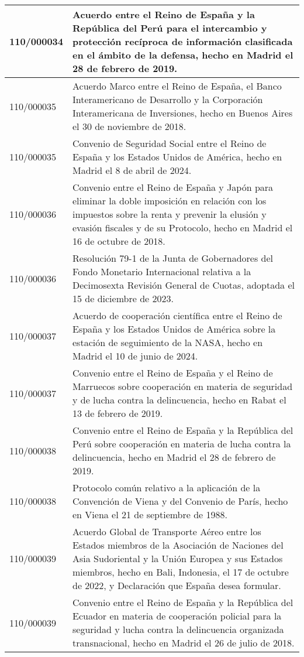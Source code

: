 {\begin{table}[H]
\begin{center}
\begin{tabularx}{\linewidth}{| l | X |}
\hline
110/000034 & Acuerdo entre el Reino de España y la República del Perú para el intercambio y protección recíproca de información clasificada en el ámbito de la defensa, hecho en Madrid el 28 de febrero de 2019. \\
\hline
110/000035 & Acuerdo Marco entre el Reino de España, el Banco Interamericano de Desarrollo y la Corporación Interamericana de Inversiones, hecho en Buenos Aires el 30 de noviembre de 2018. \\
\hline
110/000035 & Convenio de Seguridad Social entre el Reino de España y los Estados Unidos de América, hecho en Madrid el 8 de abril de 2024. \\
\hline
110/000036 & Convenio entre el Reino de España y Japón para eliminar la doble imposición en relación con los impuestos sobre la renta y prevenir la elusión y evasión fiscales y de su Protocolo, hecho en Madrid el 16 de octubre de 2018. \\
\hline
110/000036 & Resolución 79-1 de la Junta de Gobernadores del Fondo Monetario Internacional relativa a la Decimosexta Revisión General de Cuotas, adoptada el 15 de diciembre de 2023. \\
\hline
110/000037 & Acuerdo de cooperación científica entre el Reino de España y los Estados Unidos de América sobre la estación de seguimiento de la NASA, hecho en Madrid el 10 de junio de 2024. \\
\hline
110/000037 & Convenio entre el Reino de España y el Reino de Marruecos sobre cooperación en materia de seguridad y de lucha contra la delincuencia, hecho en Rabat el 13 de febrero de 2019. \\
\hline
110/000038 & Convenio entre el Reino de España y la República del Perú sobre cooperación en materia de lucha contra la delincuencia, hecho en Madrid el 28 de febrero de 2019. \\
\hline
110/000038 & Protocolo común relativo a la aplicación de la Convención de Viena y del Convenio de París, hecho en Viena el 21 de septiembre de 1988. \\
\hline
110/000039 & Acuerdo Global de Transporte Aéreo entre los Estados miembros de la Asociación de Naciones del Asia Sudoriental y la Unión Europea y sus Estados miembros, hecho en Bali, Indonesia, el 17 de octubre de 2022, y Declaración que España desea formular. \\
\hline
110/000039 & Convenio entre el Reino de España y la República del Ecuador en materia de cooperación policial para la seguridad y lucha contra la delincuencia organizada transnacional, hecho en Madrid el 26 de julio de 2018. \\

\end{tabularx}
\end{center}
\end{table}}

